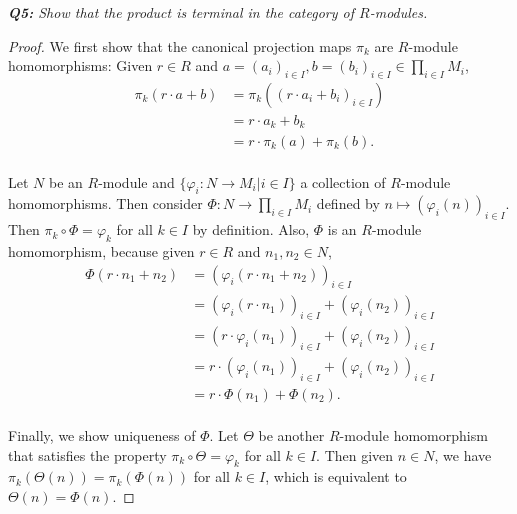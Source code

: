 \documentclass{article}
\begin{document}
\it \textbf{Q5:} Show that the product is terminal in the category of
  $R$-modules.
  \begin{proof}
    We first show that the canonical projection maps $\pi_k$ are $R$-module
    homomorphisms: Given $r\in R$ and $a=(a_i)_{i\in I}, b=(b_i)_{i\in I}\in
    \prod_{i\in I}M_i$,
    \begin{align*}
      \pi_k(r\cdot a+b) &=\pi_k((r\cdot a_i+b_i)_{i\in I})\\
      &=r\cdot a_k +b_k\\
      &=r\cdot\pi_k(a) +\pi_k(b).\\
    \end{align*}

    Let $N$ be an $R$-module and $\{\varphi_i:N\rightarrow M_i|i\in I\}$ a
    collection of $R$-module homomorphisms. Then consider
    $\Phi:N\rightarrow\prod_{i\in I}M_i$ defined by
    $n\mapsto(\varphi_i(n))_{i\in I}$. Then $\pi_k\circ\Phi=\varphi_k$ for
    all $k\in I$ by definition. Also, $\Phi$ is an $R$-module homomorphism,
    because given $r\in R$ and $n_1,n_2\in N$,
    \begin{align*}
      \Phi(r\cdot n_1+n_2) &=(\varphi_i(r\cdot n_1+n_2))_{i\in I}\\
      &=(\varphi_i(r\cdot n_1))_{i\in I} +(\varphi_i(n_2))_{i\in I}\\
      &=(r\cdot\varphi_i(n_1))_{i\in I} +(\varphi_i(n_2))_{i\in I}\\
      &=r\cdot(\varphi_i(n_1))_{i\in I} +(\varphi_i(n_2))_{i\in I}\\
      &=r\cdot\Phi(n_1) +\Phi(n_2).\\
    \end{align*}

    Finally, we show uniqueness of $\Phi$. Let $\Theta$ be another
    $R$-module homomorphism that satisfies the property
    $\pi_k\circ\Theta=\varphi_k$ for all $k\in I$. Then given $n\in N$, we
    have $\pi_k(\Theta(n))=\pi_k(\Phi(n))$ for all $k\in I$, which is
    equivalent to $\Theta(n)=\Phi(n)$.
  \end{proof}
\end{document}
